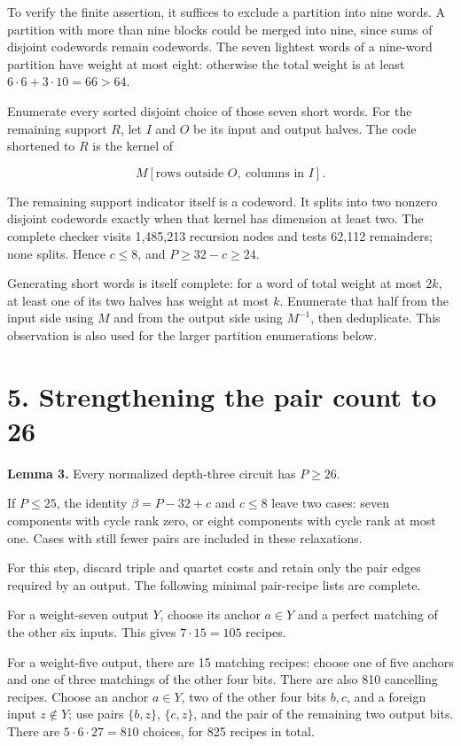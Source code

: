 To verify the finite assertion, it suffices to exclude a partition into nine words. A partition with more than nine blocks could be merged into nine, since sums of disjoint codewords remain codewords. The seven lightest words of a nine-word partition have weight at most eight: otherwise the total weight is at least \(6\cdot6+3\cdot10=66>64\).

Enumerate every sorted disjoint choice of those seven short words. For the remaining support \(R\), let \(I\) and \(O\) be its input and output halves. The code shortened to \(R\) is the kernel of

\[M[\text{rows outside }O,\ \text{columns in }I].\]

The remaining support indicator itself is a codeword. It splits into two nonzero disjoint codewords exactly when that kernel has dimension at least two. The complete checker visits 1,485,213 recursion nodes and tests 62,112 remainders; none splits. Hence \(c\leq8\), and \(P\geq32-c\geq24\).

Generating short words is itself complete: for a word of total weight at most \(2k\), at least one of its two halves has weight at most \(k\). Enumerate that half from the input side using \(M\) and from the output side using \(M^{-1}\), then deduplicate. This observation is also used for the larger partition enumerations below.

\hypertarget{strengthening-the-pair-count-to-26}{%
\section{5. Strengthening the pair count to 26}\label{strengthening-the-pair-count-to-26}}

\textbf{Lemma 3.} Every normalized depth-three circuit has \(P\geq26\).

If \(P\leq25\), the identity \(\beta=P-32+c\) and \(c\leq8\) leave two cases: seven components with cycle rank zero, or eight components with cycle rank at most one. Cases with still fewer pairs are included in these relaxations.

For this step, discard triple and quartet costs and retain only the pair edges required by an output. The following minimal pair-recipe lists are complete.

For a weight-seven output \(Y\), choose its anchor \(a\in Y\) and a perfect matching of the other six inputs. This gives \(7\cdot15=105\) recipes.

For a weight-five output, there are 15 matching recipes: choose one of five anchors and one of three matchings of the other four bits. There are also 810 cancelling recipes. Choose an anchor \(a\in Y\), two of the other four bits \(b,c\), and a foreign input \(z\notin Y\); use pairs \(\{b,z\}\), \(\{c,z\}\), and the pair of the remaining two output bits. There are \(5\cdot6\cdot27=810\) choices, for 825 recipes in total.


